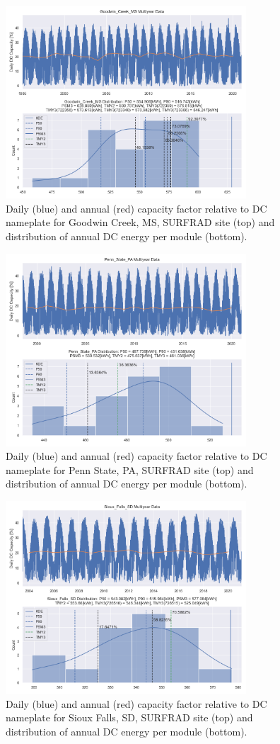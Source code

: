 \documentclass[conference]{IEEEtran}
\begin{document}
\begin{figure}[htbp]
\centerline{\includegraphics[width=9cm]{Goodwin_Creek_MS.png}}
\caption{Daily (blue) and annual (red) capacity factor relative to DC nameplate for Goodwin Creek, MS, SURFRAD site (top) and distribution of annual DC energy per module (bottom).}
\label{fig:Goodwin-Creek-MS}
\end{figure}

\begin{figure}[htbp]
\centerline{\includegraphics[width=9cm]{Penn_State_PA.png}}
\caption{Daily (blue) and annual (red) capacity factor relative to DC nameplate for Penn State, PA, SURFRAD site (top) and distribution of annual DC energy per module (bottom).}
\label{fig:Penn-State-PA}
\end{figure}

\begin{figure}[htbp]
\centerline{\includegraphics[width=9cm]{Sioux_Falls_SD.png}}
\caption{Daily (blue) and annual (red) capacity factor relative to DC nameplate for Sioux Falls, SD, SURFRAD site (top) and distribution of annual DC energy per module (bottom).}
\label{fig:Sioux-Falls-SD}
\end{figure}
\end{document}
